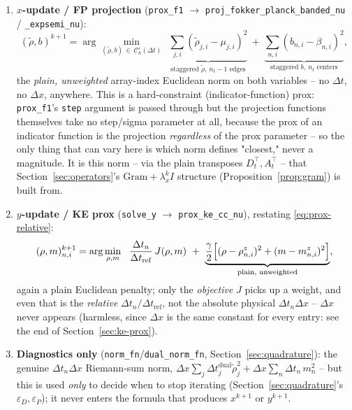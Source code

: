 \documentclass[11pt]{article}
\newcommand{\eps}{\varepsilon}
\newcommand{\dt}{\Delta t}
\newcommand{\dx}{\Delta x}
\newcommand{\Ch}{\mathcal{C}^\eps_h}
\newcommand{\code}[1]{\texttt{#1}}
\newcommand{\lx}{\lambda_x^k}
\begin{document}
\begin{enumerate}
\item \textbf{$x$-update / FP projection} (\code{prox\_f1} $\to$
  \code{proj\_fokker\_planck\_banded\_nu} / \code{\_expsemi\_nu}):
  \begin{equation}
    \label{eq:proj-norm-today}
    (\tilde\rho,b)^{k+1} = \arg\min_{(\tilde\rho,b)\,\in\,\Ch(\dt)}\ \
    \underbrace{\sum_{j,i}(\tilde\rho_{j,i}-\mu_{j,i})^2}_{\text{staggered }\tilde\rho,\ n_t{-}1\text{ edges}}
    \ + \
    \underbrace{\sum_{n,i}(b_{n,i}-\beta_{n,i})^2}_{\text{staggered }b,\ n_t\text{ centers}},
  \end{equation}
  the \emph{plain, unweighted} array-index Euclidean norm on both variables -- no $\dt$, no $\dx$,
  anywhere. This is a hard-constraint (indicator-function) prox: \code{prox\_f1}'s \code{step}
  argument is passed through but the projection functions themselves take no step/sigma parameter
  at all, because the prox of an indicator function is the projection \emph{regardless} of the
  prox parameter -- so the only thing that can vary here is which norm defines "closest," never a
  magnitude. It is this norm -- via the plain transposes $D_t^\top,A_t^\top$ -- that
  Section~\ref{sec:operators}'s $\mathrm{Gram}+\lx I$ structure (Proposition~\ref{prop:gram}) is
  built from.
\item \textbf{$y$-update / KE prox} (\code{solve\_y} $\to$ \code{prox\_ke\_cc\_nu}), restating
  \eqref{eq:prox-relative}:
  \begin{equation}
    \label{eq:ke-norm-today}
    (\rho,m)^{k+1}_{n,i} = \arg\min_{\rho,m}\ \ \frac{\dt_n}{\dt_\mathrm{ref}}\,J(\rho,m)
    \ + \ \underbrace{\frac{\gamma}{2}\Bigl[(\rho-\rho^z_{n,i})^2+(m-m^z_{n,i})^2\Bigr]}_{\text{plain, unweighted}},
  \end{equation}
  again a plain Euclidean penalty; only the \emph{objective} $J$ picks up a weight, and even that
  is the \emph{relative} $\dt_n/\dt_\mathrm{ref}$, not the absolute physical $\dt_n\dx$ -- $\dx$
  never appears (harmless, since $\dx$ is the same constant for every entry: see the end of
  Section~\ref{sec:ke-prox}).
\item \textbf{Diagnostics only} (\code{norm\_fn}/\code{dual\_norm\_fn}, Section~\ref{sec:quadrature}):
  the genuine $\dt_n\dx$ Riemann-sum norm, $\dx\sum_j\dt_j^{\mathrm{dual}}\tilde\rho_j^2 +
  \dx\sum_n\dt_n\,m_n^2$ -- but this is used \emph{only} to decide when to stop iterating
  (Section~\ref{sec:quadrature}'s $\eps_D,\eps_P$); it never enters the formula that produces
  $x^{k+1}$ or $y^{k+1}$.
\end{enumerate}
\end{document}
